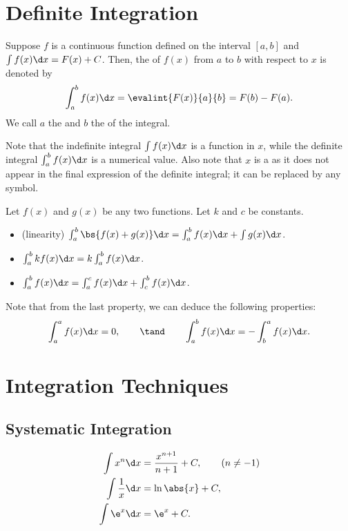 \section{Definite Integration}

\begin{definition}
    Suppose $f$ is a continuous function defined on the interval $[a, b]$ and $\int f(x) \d x = F(x) + C$. Then, the  of $f(x)$ from $a$ to $b$ with respect to $x$ is denoted by \[\int_a^b f(x) \d x = \evalint{F(x)}{a}{b} = F(b) - F(a).\] We call $a$ the  and $b$ the  of the integral.
\end{definition}

Note that the indefinite integral $\int f(x) \d x$ is a function in $x$, while the definite integral $\int_a^b f(x) \d x$ is a numerical value. Also note that $x$ is a  as it does not appear in the final expression of the definite integral; it can be replaced by any symbol.

\begin{fact}
    Let $f(x)$ and $g(x)$ be any two functions. Let $k$ and $c$ be constants.
    \begin{itemize}
        \item (linearity) $\int_a^b \bs{f(x) + g(x)} \d x = \int_a^b f(x) \d x + \int g(x) \d x$.
        \item $\int_a^b k f(x) \d x = k \int_a^b f(x) \d x$.
        \item $\int_a^b f(x) \d x = \int_a^c f(x) \d x + \int_c^b f(x) \d x$.
    \end{itemize}
\end{fact}

Note that from the last property, we can deduce the following properties: \[\int_a^a f(x) \d x = 0, \qquad \tand \qquad \int_a^b f(x) \d x = -\int_b^a f(x) \d x.\]

\section{Integration Techniques}

\subsection{Systematic Integration}

\begin{proposition}
    \begin{align*}
        \int x^n \d x &= \frac{x^{n+1}}{n+1} + C, \tag{$n \neq -1$}\\
        \int \frac1x \d x &= \ln \abs{x} + C,\\
        \int \e^x \d x &= \e^x + C.
    \end{align*}
\end{proposition}

